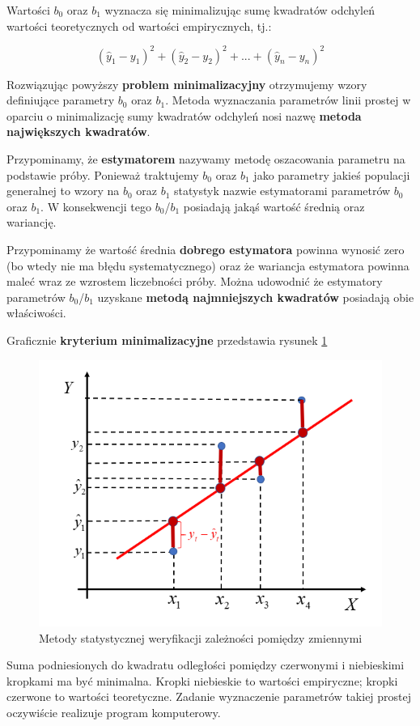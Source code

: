\documentclass[
  openany]{book}
\begin{document}
Wartości \(b_0\) oraz \(b_1\) wyznacza się minimalizując sumę kwadratów
odchyleń wartości teoretycznych od wartości empirycznych, tj.:

\[(\hat y_1 - y_1)^2 + (\hat y_2 - y_2)^2 + ... +  (\hat y_n - y_n)^2\]

Rozwiązując powyższy \textbf{problem minimalizacyjny} otrzymujemy wzory
definiujące parametry \(b_0\) oraz \(b_1\). Metoda wyznaczania parametrów
linii prostej w oparciu o minimalizację sumy kwadratów odchyleń
nosi nazwę \textbf{metoda największych kwadratów}.

Przypominamy, że \textbf{estymatorem} nazywamy metodę oszacowania parametru na podstawie próby.
Ponieważ traktujemy \(b_0\) oraz \(b_1\) jako parametry jakieś populacji generalnej
to wzory na \(b_0\) oraz \(b_1\) statystyk nazwie estymatorami parametrów
\(b_0\) oraz \(b_1\). W konsekwencji tego \(b_0\)/\(b_1\) posiadają jakąś wartość średnią oraz wariancję.

Przypominamy że wartość średnia \textbf{dobrego estymatora} powinna wynosić zero (bo wtedy nie ma błędu systematycznego)
oraz że wariancja estymatora powinna maleć wraz ze wzrostem liczebności próby. Można udowodnić
że estymatory parametrów \(b_0\)/\(b_1\)
uzyskane \textbf{metodą najmniejszych kwadratów} posiadają obie właściwości.

Graficznie \textbf{kryterium minimalizacyjne} przedstawia rysunek \ref{fig:KMNK}

\begin{figure}
\includegraphics[width=0.8\linewidth]{./kmnk_roznice} \caption{Metody statystycznej weryfikacji zależności pomiędzy zmiennymi}\label{fig:KMNK}
\end{figure}

Suma podniesionych do kwadratu odległości pomiędzy czerwonymi
i niebieskimi kropkami ma być minimalna. Kropki niebieskie to
wartości empiryczne; kropki czerwone to wartości teoretyczne.
Zadanie wyznaczenie
parametrów takiej prostej oczywiście realizuje program komputerowy.
\end{document}
